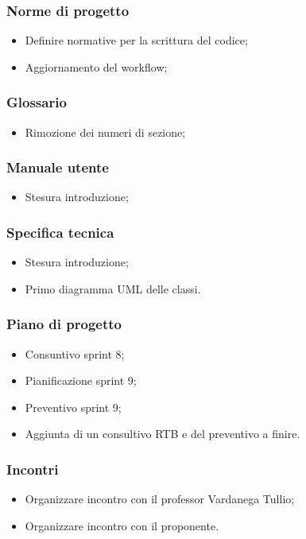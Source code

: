 \subsubsection{Norme di progetto}
\begin{itemize}
    \item Definire normative per la scrittura del codice;
    \item Aggiornamento del workflow;
\end{itemize}

\subsubsection{Glossario}
\begin{itemize}
    \item Rimozione dei numeri di sezione;
\end{itemize}

\subsubsection{Manuale utente}
\begin{itemize}
    \item Stesura introduzione;
\end{itemize}

\subsubsection{Specifica tecnica}
\begin{itemize}
    \item Stesura introduzione;
    \item Primo diagramma UML delle classi.
\end{itemize}

\subsubsection{Piano di progetto}
\begin{itemize}
    \item Consuntivo sprint 8;
    \item Pianificazione sprint 9;
    \item Preventivo sprint 9;
    \item  Aggiunta di un consultivo RTB e del preventivo a finire.
\end{itemize}

\subsubsection{Incontri}
\begin{itemize}
    \item Organizzare incontro con il professor Vardanega Tullio;
    \item Organizzare incontro con il proponente.
\end{itemize}
